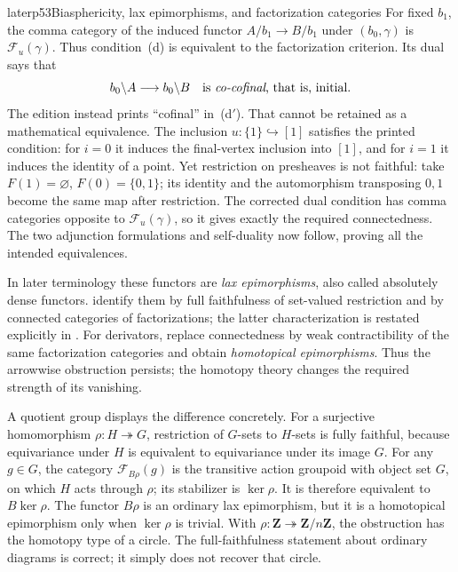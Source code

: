 \begin{dcomment}{later}{p53}{Biasphericity, lax epimorphisms, and factorization categories}
For fixed $b_1$, the comma category of the induced functor $A/b_1\longrightarrow B/b_1$ under $(b_0,\gamma)$ is $\mathcal F_u(\gamma)$. Thus condition~(d) is equivalent to the factorization criterion. Its dual says that
\[
 b_0\backslash A\longrightarrow b_0\backslash B
 \quad\text{is \emph{co-cofinal}, that is, initial.}
\]
The edition instead prints ``cofinal'' in~(d$'$). That cannot be retained as a mathematical equivalence. The inclusion $u:\{1\}\hookrightarrow[1]$ satisfies the printed condition: for $i=0$ it induces the final-vertex inclusion into $[1]$, and for $i=1$ it induces the identity of a point. Yet restriction on presheaves is not faithful: take $F(1)=\varnothing$, $F(0)=\{0,1\}$; its identity and the automorphism transposing $0,1$ become the same map after restriction. The corrected dual condition has comma categories opposite to $\mathcal F_u(\gamma)$, so it gives exactly the required connectedness. The two adjunction formulations and self-duality now follow, proving all the intended equivalences.

In later terminology these functors are \emph{lax epimorphisms}, also called absolutely dense functors. \citet{AdamekElBashirSobralVelebil2001} identify them by full faithfulness of set-valued restriction and by connected categories of factorizations; the latter characterization is restated explicitly in \citet[Theorem~4.1]{NunesSousa2022}. For derivators, \citet[Theorem~6.10]{GrothStovicek2016Trees} replace connectedness by weak contractibility of the same factorization categories and obtain \emph{homotopical epimorphisms}. Thus the arrowwise obstruction persists; the homotopy theory changes the required strength of its vanishing.

A quotient group displays the difference concretely. For a surjective homomorphism $\rho:H\twoheadrightarrow G$, restriction of $G$-sets to $H$-sets is fully faithful, because equivariance under $H$ is equivalent to equivariance under its image $G$. For any $g\in G$, the category $\mathcal F_{B\rho}(g)$ is the transitive action groupoid with object set $G$, on which $H$ acts through $\rho$; its stabilizer is $\ker\rho$. It is therefore equivalent to $B\ker\rho$. The functor $B\rho$ is an ordinary lax epimorphism, but it is a homotopical epimorphism only when $\ker\rho$ is trivial. With $\rho:\mathbf Z\twoheadrightarrow\mathbf Z/n\mathbf Z$, the obstruction has the homotopy type of a circle. The full-faithfulness statement about ordinary diagrams is correct; it simply does not recover that circle.
\end{dcomment}
